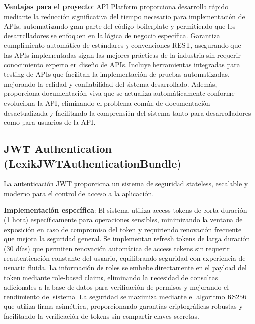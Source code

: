 \documentclass[12pt,a4paper,oneside]{report}
\begin{document}
\textbf{Ventajas para el proyecto}: API Platform proporciona desarrollo rápido mediante la reducción significativa del tiempo necesario para implementación de APIs, automatizando gran parte del código boilerplate y permitiendo que los desarrolladores se enfoquen en la lógica de negocio específica. Garantiza cumplimiento automático de estándares y convenciones REST, asegurando que las APIs implementadas sigan las mejores prácticas de la industria sin requerir conocimiento experto en diseño de APIs. Incluye herramientas integradas para testing de APIs que facilitan la implementación de pruebas automatizadas, mejorando la calidad y confiabilidad del sistema desarrollado. Además, proporciona documentación viva que se actualiza automáticamente conforme evoluciona la API, eliminando el problema común de documentación desactualizada y facilitando la comprensión del sistema tanto para desarrolladores como para usuarios de la API.

\subsection{JWT Authentication
(LexikJWTAuthenticationBundle)}\label{jwt-authentication-lexikjwtauthenticationbundle}

La autenticación JWT proporciona un sistema de seguridad stateless,
escalable y moderno para el control de acceso a la aplicación.

\textbf{Implementación específica}: El sistema utiliza access tokens de corta duración (1 hora) específicamente para operaciones sensibles, minimizando la ventana de exposición en caso de compromiso del token y requiriendo renovación frecuente que mejora la seguridad general. Se implementan refresh tokens de larga duración (30 días) que permiten renovación automática de access tokens sin requerir reautenticación constante del usuario, equilibrando seguridad con experiencia de usuario fluida. La información de roles se embebe directamente en el payload del token mediante role-based claims, eliminando la necesidad de consultas adicionales a la base de datos para verificación de permisos y mejorando el rendimiento del sistema. La seguridad se maximiza mediante el algoritmo RS256 que utiliza firma asimétrica, proporcionando garantías criptográficas robustas y facilitando la verificación de tokens sin compartir claves secretas.
\end{document}

